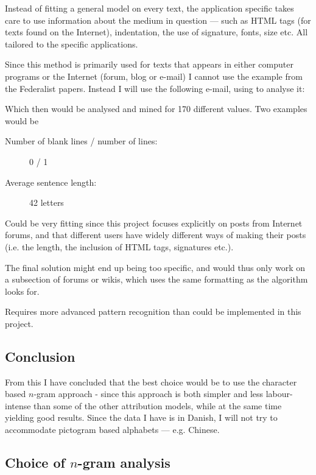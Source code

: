 {\label{application}
Instead of fitting a general model on every text, the application specific takes care to use information about the medium in question --- such as HTML tags (for texts found on the Internet), indentation, the use of signature, fonts, size etc. All tailored to the specific applications.
}
{
Since this method is primarily used for texts that appears in either computer programs or the Internet (forum, blog or e-mail) I cannot use the example from the Federalist papers. Instead I will use the following e-mail, using \cite{Vel01mininge-mail} to analyse it: 


Which then would be analysed and mined for 170 different values. Two examples would be
\begin{description}
\item[Number of blank lines / number of lines:] 0 / 1
\item[Average sentence length:] 42 letters
\end{description}
}{
\item Could be very fitting since this project focuses explicitly on posts from Internet forums, and that different users have widely different ways of making their posts (i.e. the length, the inclusion of HTML tags, signatures etc.).
}{
\item The final solution might end up being too specific, and would thus only work on a subsection of forums or wikis, which uses the same formatting as the algorithm looks for.
\item Requires more advanced pattern recognition than could be implemented in this project. 
}

\subsection{Conclusion}
\label{technique:conclusion}
From this I have concluded that the best choice would be to use the character based $n$-gram approach - since this approach is both simpler and less labour-intense than some of the other attribution models, while at the same time yielding good results. Since the data I have is in Danish, I will not try to accommodate pictogram based alphabets --- e.g. Chinese.


\subsection{Choice of $n$-gram analysis}

